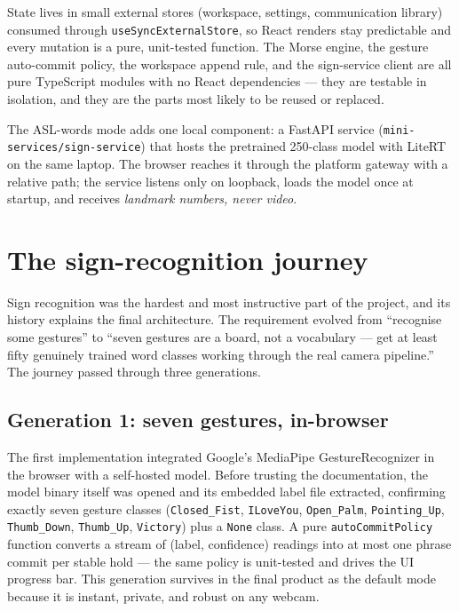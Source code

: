 \documentclass[11pt,a4paper]{article}
\newcommand{\code}[1]{\texttt{#1}}
\begin{document}
State lives in small external stores (workspace, settings, communication library) consumed through \code{useSyncExternalStore}, so React renders stay predictable and every mutation is a pure, unit-tested function. The Morse engine, the gesture auto-commit policy, the workspace append rule, and the sign-service client are all pure TypeScript modules with no React dependencies --- they are testable in isolation, and they are the parts most likely to be reused or replaced.

The ASL-words mode adds one local component: a FastAPI service (\code{mini-services/sign-service}) that hosts the pretrained 250-class model with LiteRT on the same laptop. The browser reaches it through the platform gateway with a relative path; the service listens only on loopback, loads the model once at startup, and receives \emph{landmark numbers, never video}.

\section{The sign-recognition journey}\label{sec:sign-journey}

Sign recognition was the hardest and most instructive part of the project, and its history explains the final architecture. The requirement evolved from ``recognise some gestures'' to ``seven gestures are a board, not a vocabulary --- get at least fifty genuinely trained word classes working through the real camera pipeline.'' The journey passed through three generations.

\subsection{Generation 1: seven gestures, in-browser}

The first implementation integrated Google's MediaPipe GestureRecognizer in the browser with a self-hosted model. Before trusting the documentation, the model binary itself was opened and its embedded label file extracted, confirming exactly seven gesture classes (\code{Closed\_Fist}, \code{ILoveYou}, \code{Open\_Palm}, \code{Pointing\_Up}, \code{Thumb\_Down}, \code{Thumb\_Up}, \code{Victory}) plus a \code{None} class. A pure \code{autoCommitPolicy} function converts a stream of (label, confidence) readings into at most one phrase commit per stable hold --- the same policy is unit-tested and drives the UI progress bar. This generation survives in the final product as the default mode because it is instant, private, and robust on any webcam.
\end{document}

